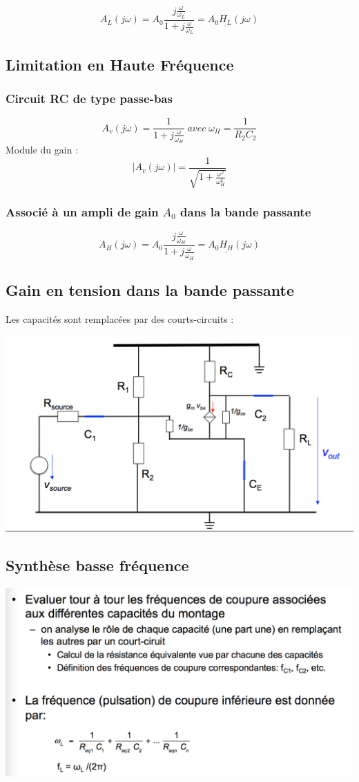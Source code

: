 \documentclass[]{article}
\begin{document}
$$ A_L(j\omega) = A_0  \frac{j\frac{\omega}{\omega_L}}{1+j\frac{\omega}{\omega_L}} =  A_0 \underline{H_L}(j\omega)$$

\subsection{Limitation en Haute Fréquence}
\subsubsection{Circuit RC de type passe-bas}
$$ A_v(j\omega) = \frac{1}{1+j\frac{\omega}{\omega_H}} \; avec \; \omega_H = \frac{1}{R_2C_2} $$
Module du gain : $$ \mid A_v(j\omega) \mid = \frac{1}{\sqrt{1+\frac{\omega^2}{\omega_H^2}}}  $$

\subsubsection{Associé à un ampli de gain $A_0$ dans la bande passante}

$$ A_H(j\omega) = A_0  \frac{j\frac{\omega}{\omega_H}}{1+j\frac{\omega}{\omega_H}} =  A_0 \underline{H_H}(j\omega) $$

\subsection{Gain en tension dans la bande passante}
Les capacités sont remplacées par des courts-circuits :

\includegraphics[scale=0.6]{gainvbdp}

\subsection{Synthèse basse fréquence}
\includegraphics[scale=0.6]{synthbf}
\end{document}
